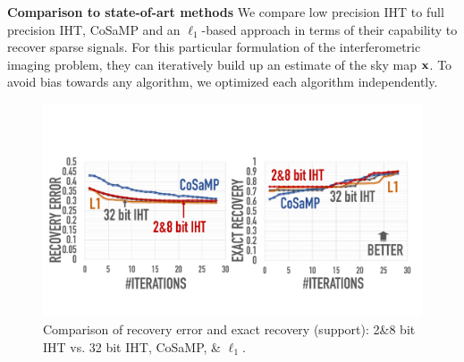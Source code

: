\documentclass[aoas,preprint]{imsart}
\numberwithin{equation}{section}
\theoremstyle{plain}
\begin{document}
{%

\vspace{0.5em}

{\bf Comparison to state-of-art methods}
We compare low precision IHT to full precision IHT, CoSaMP and an $\ell_1$-based approach in terms of their capability to recover sparse signals. For this particular formulation of the interferometric imaging problem, they can iteratively build up an estimate of the sky map ${\bf x}$. To avoid bias towards any algorithm, we optimized each algorithm independently.

\begin{figure}[t]
\centering
\includegraphics[width=1\columnwidth, angle=0]{figs/comparison1.pdf}
\caption{Comparison of recovery error and exact recovery (support): {2\&8 bit} IHT vs. 32 bit IHT, CoSaMP, \& $\ell_1$.}
\label{fig:comparison}
\vspace{-1em}
\end{figure}
\vspace{0.5em}

}
\end{document}
